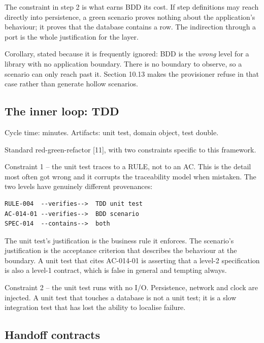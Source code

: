 \documentclass[11pt,a4paper]{article}
\begin{document}
The constraint in step 2 is what earns BDD its cost. If step definitions may reach directly into persistence, a green scenario proves nothing about the application's behaviour; it proves that the database contains a row. The indirection through a port is the whole justification for the layer.

Corollary, stated because it is frequently ignored: BDD is the \emph{wrong} level for a library with no application boundary. There is no boundary to observe, so a scenario can only reach past it. Section 10.13 makes the provisioner refuse in that case rather than generate hollow scenarios.

\subsection{The inner loop: TDD}

Cycle time: minutes. Artifacts: unit test, domain object, test double.

Standard red-green-refactor [11], with two constraints specific to this framework.

Constraint 1 -- the unit test traces to a RULE, not to an AC. This is the detail most often got wrong and it corrupts the traceability model when mistaken. The two levels have genuinely different provenances:

\begin{Verbatim}[fontsize=\footnotesize,breaklines=true,breakanywhere=true,breakautoindent=false,samepage=false]
RULE-004  --verifies-->  TDD unit test
AC-014-01 --verifies-->  BDD scenario
SPEC-014  --contains-->  both
\end{Verbatim}

The unit test's justification is the business rule it enforces. The scenario's justification is the acceptance criterion that describes the behaviour at the boundary. A unit test that cites AC-014-01 is asserting that a level-2 specification is also a level-1 contract, which is false in general and tempting always.

Constraint 2 -- the unit test runs with no I/O. Persistence, network and clock are injected. A unit test that touches a database is not a unit test; it is a slow integration test that has lost the ability to localise failure.

\subsection{Handoff contracts}
\end{document}
